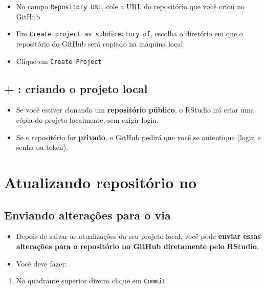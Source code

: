 \documentclass[
  letterpaper,
  DIV=11,
  numbers=noendperiod]{scrartcl}
\providecommand{\tightlist}{%
  \setlength{\itemsep}{0pt}\setlength{\parskip}{0pt}}
\begin{document}
\begin{itemize}
\item
  No campo \texttt{Repository\ URL}, cole a URL do repositório que você
  criou no GitHub
\item
  Em \texttt{Create\ project\ as\ subdirectory\ of}, escolha o diretório
  em que o repositório do GitHub será copiado na máquina local
\item
  Clique em \texttt{Create\ Project}
\end{itemize}

\subsection{\texorpdfstring{ + : criando o projeto
local}{ + : criando o projeto local}}\label{criando-o-projeto-local-3}

\begin{itemize}
\item
  Se você estiver clonando um \textbf{repositório público}, o RStudio
  irá criar uma cópia do projeto localmente, sem exigir login.
\item
  Se o repositório for \textbf{privado}, o GitHub pedirá que você se
  autentique (login e senha ou token).
\end{itemize}

\section{\texorpdfstring{Atualizando repositório no
}{Atualizando repositório no }}\label{atualizando-reposituxf3rio-no}

\subsection{\texorpdfstring{Enviando alterações para o via
}{Enviando alterações para o  via }}\label{enviando-alterauxe7uxf5es-para-o-via}

\begin{itemize}
\item
  Depois de salvar as atualizações do seu projeto local, você pode
  \textbf{enviar essas alterações para o repositório no GitHub
  diretamente pelo RStudio}.
\item
  Você deve fazer:
\end{itemize}

\begin{enumerate}
\def\labelenumi{\arabic{enumi}.}
\tightlist
\item
  No quadrante superior direito clique em \texttt{Commit}
\end{enumerate}
\end{document}
